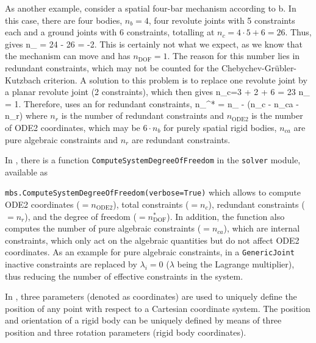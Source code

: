 As another example, consider a spatial four-bar mechanism according to b.
In this case, there are four bodies, $n_b=4$, four revolute joints with 5 constraints each and a ground joints with 6 constraints, totalling at $n_c=4\cdot 5 + 6 = 26$. Thus,  gives 
\be
  n_ = 24 - 26 = -2.
\ee
This is certainly not what we expect, as we know that the mechanism can move and has $n_\mathrm{DOF} = 1$. The reason for this number lies in redundant constraints, which may not be counted for the Chebychev-Gr\"ubler-Kutzbach criterion.
A solution to this problem is to replace one revolute joint by a planar revolute joint (2 constraints), which then gives
\be
  n_c=3 + 2 + 6 = 23 \quad {} \quad n_ = 1.
\ee
Therefore, \codeName uses an  for redundant constraints,
\be \label{eq:Chebychev:Grubler:Kutzbach:ext}
  n_^* = n_ - (n_c - n_{ca} - n_r)
\ee
where $n_r$ is the number of redundant constraints and $n_\mathrm{ODE2}$ is the number of \ac{ODE2} coordinates, which may be $6 \cdot n_b$ for purely spatial rigid bodies, $n_{ca}$ are pure algebraic constraints and $n_r$ are redundant constraints.

In \codeName, there is a function \texttt{ComputeSystemDegreeOfFreedom} in the \texttt{solver} module, available as
\bi
  \item[] \texttt{mbs.ComputeSystemDegreeOfFreedom(verbose=True)}
\ei
which allows to compute \ac{ODE2} coordinates ($=n_\mathrm{ODE2}$), total constraints ($=n_c$), redundant constraints ($=n_r$), and the degree of freedom ($=n_\mathrm{DOF}^*$). In addition, the function also computes the number of pure algebraic constraints ($=n_{ca}$), which are internal constraints, which only act on the algebraic quantities but do not affect \ac{ODE2} coordinates. 
As an example for pure algebraic constraints, in a \texttt{GenericJoint} inactive constraints are replaced by $\lambda_i=0$ ($\lambda$ being the Lagrange multiplier), thus reducing the number of effective constraints in the system.
%


 
In , three parameters (denoted as coordinates) are used to uniquely define the position of any point with respect to a Cartesian coordinate system.
The position and orientation of a rigid body can be uniquely defined by means of three position and three rotation parameters (rigid body coordinates).

